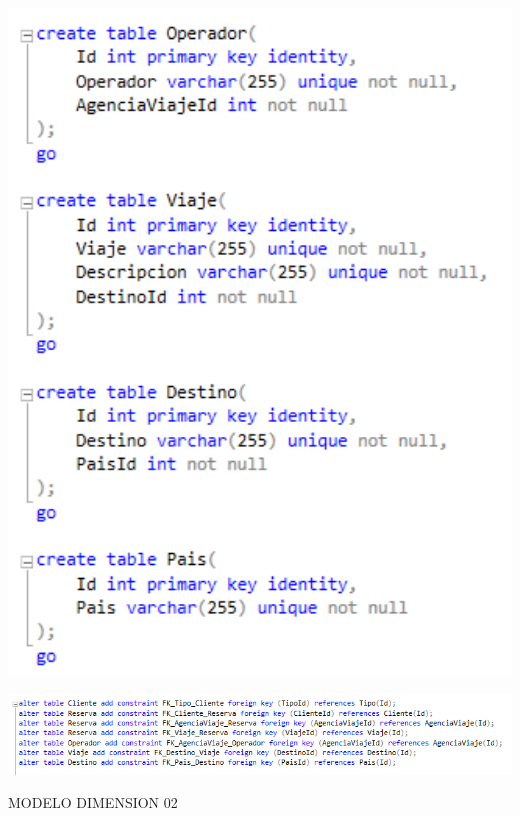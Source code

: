 	\begin{center}
	\includegraphics[width=17cm]{./Imagenes/22}
	\end{center}	

	\begin{center}
	\includegraphics[width=17cm]{./Imagenes/23}
	\end{center}	

MODELO DIMENSION 02

